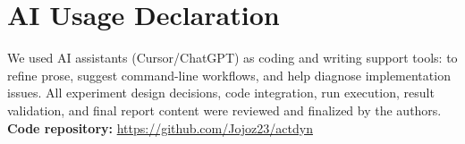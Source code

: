 \documentclass{article}
\begin{document}
\section{AI Usage Declaration}

We used AI assistants (Cursor/ChatGPT) as coding and writing support tools: to refine prose, suggest command-line workflows, and help diagnose implementation issues. All experiment design decisions, code integration, run execution, result validation, and final report content were reviewed and finalized by the authors.
\noindent\textbf{Code repository:} \url{https://github.com/Jojoz23/actdyn}





\end{document}
